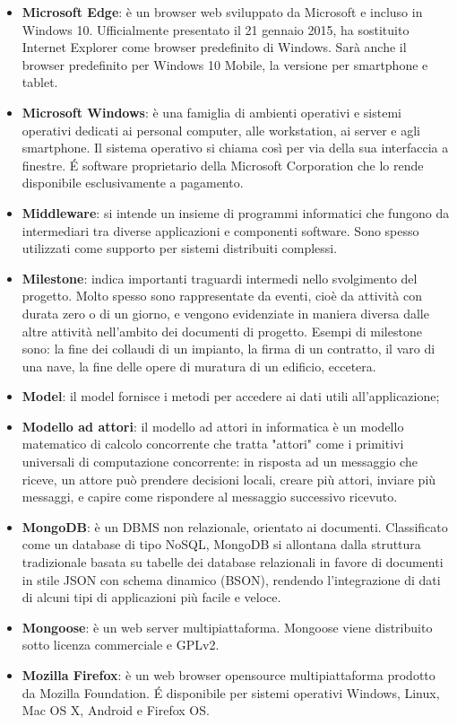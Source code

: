 \begin{itemize}
	\item
	\textbf{Microsoft Edge}: è un browser web sviluppato da Microsoft e incluso in Windows 10. Ufficialmente presentato il 21 gennaio 2015, ha sostituito Internet Explorer come browser predefinito di Windows. Sarà anche il browser predefinito per Windows 10 Mobile, la versione per smartphone e tablet.
	\item
	\textbf{Microsoft Windows}: è una famiglia di ambienti operativi e sistemi operativi dedicati ai personal computer, alle workstation, ai server e agli smartphone. Il sistema operativo si chiama così per via della sua interfaccia a finestre.
	\'E software proprietario della Microsoft Corporation che lo rende disponibile esclusivamente a pagamento.
	\item
	\textbf{Middleware}: si intende un insieme di programmi informatici che fungono da intermediari tra diverse applicazioni e componenti software. Sono spesso utilizzati come supporto per sistemi distribuiti complessi.
	\item
	\textbf{Milestone}: indica importanti traguardi intermedi nello svolgimento del progetto. Molto spesso sono rappresentate da eventi, cioè da attività con durata zero o di un giorno, e vengono evidenziate in maniera diversa dalle altre attività nell'ambito dei documenti di progetto. Esempi di milestone sono: la fine dei collaudi di un impianto, la firma di un contratto, il varo di una nave, la fine delle opere di muratura di un edificio, eccetera.
	\item
	\textbf{Model}: il model fornisce i metodi per accedere ai dati utili all'applicazione;
	\item
	\textbf{Modello ad attori}: il modello ad attori in informatica è un modello matematico di calcolo concorrente che tratta "attori" come i primitivi universali di computazione concorrente: in risposta ad un messaggio che riceve, un attore può prendere decisioni locali, creare più attori, inviare più messaggi, e capire come rispondere al messaggio successivo ricevuto. 
	\item
	\textbf{MongoDB}: è un DBMS non relazionale, orientato ai documenti. Classificato come un database di tipo NoSQL, MongoDB si allontana dalla struttura tradizionale basata su tabelle dei database relazionali in favore di documenti in stile JSON con schema dinamico (BSON), rendendo l'integrazione di dati di alcuni tipi di applicazioni più facile e veloce. 
	\item
	\textbf{Mongoose}: è un web server multipiattaforma. Mongoose viene distribuito sotto licenza commerciale e GPLv2. 
	\item 
	\textbf{Mozilla Firefox}: è un web browser opensource multipiattaforma prodotto da Mozilla Foundation. \'E disponibile per sistemi operativi Windows, Linux, Mac OS X, Android e Firefox OS. 
\end{itemize}
